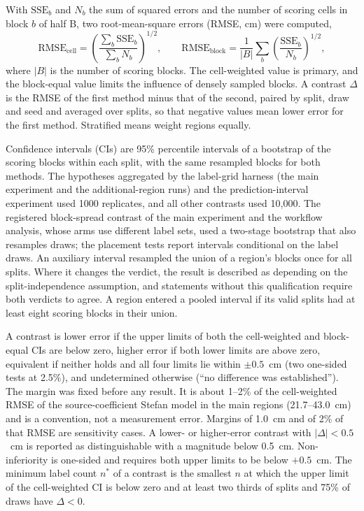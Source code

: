 With $\mathrm{SSE}_b$ and $N_b$ the sum of squared errors and the number of scoring cells in block $b$ of half B, two root-mean-square errors (RMSE, cm) were computed,
\begin{equation}
\mathrm{RMSE}_{\mathrm{cell}} = \left(\frac{\sum_b \mathrm{SSE}_b}{\sum_b N_b}\right)^{1/2}, \qquad \mathrm{RMSE}_{\mathrm{block}} = \frac{1}{|B|}\sum_b \left(\frac{\mathrm{SSE}_b}{N_b}\right)^{1/2},
\label{eq:rmse}
\end{equation}
where $|B|$ is the number of scoring blocks. The cell-weighted value is primary, and the block-equal value limits the influence of densely sampled blocks. A contrast $\Delta$ is the RMSE of the first method minus that of the second, paired by split, draw and seed and averaged over splits, so that negative values mean lower error for the first method. Stratified means weight regions equally.

Confidence intervals (CIs) are 95\% percentile intervals of a bootstrap of the scoring blocks within each split, with the same resampled blocks for both methods. The hypotheses aggregated by the label-grid harness (the main experiment and the additional-region runs) and the prediction-interval experiment used 1000 replicates, and all other contrasts used 10,000. The registered block-spread contrast of the main experiment and the workflow analysis, whose arms use different label sets, used a two-stage bootstrap that also resamples draws; the placement tests report intervals conditional on the label draws. An auxiliary interval resampled the union of a region's blocks once for all splits. Where it changes the verdict, the result is described as depending on the split-independence assumption, and statements without this qualification require both verdicts to agree. A region entered a pooled interval if its valid splits had at least eight scoring blocks in their union.

A contrast is lower error if the upper limits of both the cell-weighted and block-equal CIs are below zero, higher error if both lower limits are above zero, equivalent if neither holds and all four limits lie within $\pm 0.5$~cm (two one-sided tests at 2.5\%\cite{Schuirmann1987}), and undetermined otherwise (``no difference was established''). The margin was fixed before any result. It is about 1--2\% of the cell-weighted RMSE of the source-coefficient Stefan model in the main regions (21.7--43.0~cm) and is a convention, not a measurement error. Margins of 1.0~cm and of 2\% of that RMSE are sensitivity cases. A lower- or higher-error contrast with $|\Delta| < 0.5$~cm is reported as distinguishable with a magnitude below 0.5~cm. Non-inferiority is one-sided and requires both upper limits to be below $+0.5$~cm. The minimum label count $n^{*}$ of a contrast is the smallest $n$ at which the upper limit of the cell-weighted CI is below zero and at least two thirds of splits and 75\% of draws have $\Delta < 0$.

